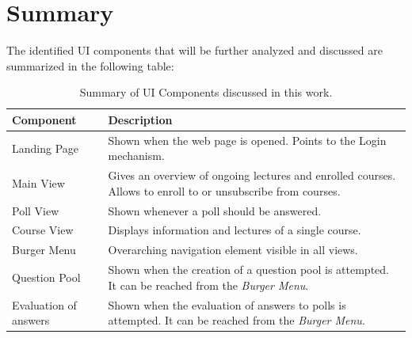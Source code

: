 \section{Summary}
The identified UI components that will be further analyzed and discussed are summarized in the following table:

\begin{table}[H]
	{\renewcommand{\arraystretch}{2}
		\begin{tabular}{ | p{4cm} | p{11cm} |}
			\hline
			Component & Description \\ \hline \hline
			Landing Page & Shown when the web page is opened. Points to the Login mechanism. \\ \hline
			Main View & Gives an overview of ongoing lectures and enrolled courses. Allows to enroll to or unsubscribe from courses. \\ \hline
			Poll View & Shown whenever a poll should be answered. \\ \hline
			Course View & Displays information and lectures of a single course. \\ \hline
			Burger Menu & Overarching navigation element visible in all views. \\ \hline
			Question Pool & Shown when the creation of a question pool is attempted. It can be reached from the \emph{Burger Menu}. \\ \hline
			Evaluation of answers & Shown when the evaluation of answers to polls is attempted. It can be reached from the \emph{Burger Menu}. \\ \hline
		\end{tabular}
	}
	\caption{Summary of UI Components discussed in this work.}
	\label{tab:components}
\end{table}

